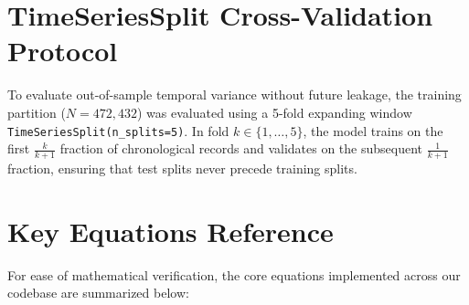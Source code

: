 \documentclass[11pt,a4paper]{report}
\begin{document}
\chapter{TimeSeriesSplit Cross-Validation Protocol}
\label{app:timeseriessplit}
To evaluate out-of-sample temporal variance without future leakage, the training partition ($N = 472,432$) was evaluated using a 5-fold expanding window \texttt{TimeSeriesSplit(n\_splits=5)}. In fold $k \in \{1, \dots, 5\}$, the model trains on the first $\frac{k}{k+1}$ fraction of chronological records and validates on the subsequent $\frac{1}{k+1}$ fraction, ensuring that test splits never precede training splits.

\chapter{Key Equations Reference}
\label{app:equations}
For ease of mathematical verification, the core equations implemented across our codebase are summarized below:
\end{document}

